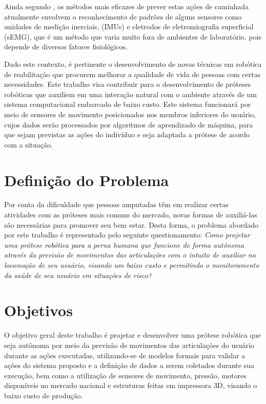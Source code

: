 Ainda segundo , os métodos mais eficazes de prever estas ações de caminhada atualmente envolvem o reconhecimento de padrões de alguns sensores como unidades de medição inerciais, (IMUs) e eletrodos de eletromiografia superficial (sEMG), que é um método que varia muito fora de ambientes de laboratório, pois depende de diversos fatores fisiológicos.

Dado este contexto, é pertinente o desenvolvimento de novas técnicas em robótica de reabilitação que procurem melhorar a qualidade de vida de pessoas com certas necessidades. Este trabalho visa contribuir para o desenvolvimento de próteses robóticas que auxiliem em uma interação natural com o ambiente através de um sistema computacional embarcado de baixo custo. Este sistema funcionará por meio de sensores de movimento posicionados nos membros inferiores do usuário, cujos dados serão processados por algoritmos de aprendizado de máquina, para que sejam previstas as ações do indivíduo e seja adaptada a prótese de acordo com a situação.

\section{Definição do Problema}
Por conta da dificuldade que pessoas amputadas têm em realizar certas atividades com as próteses mais comuns do mercado, novas formas de auxiliá-las são necessárias para promover seu bem estar. Desta forma, o problema abordado por este trabalho é representado pelo seguinte questionamento: \textit{Como projetar uma prótese robótica para a perna humana que funcione de forma autônoma através da previsão de movimentos das articulações com o intuito de auxiliar na locomoção de seu usuário, visando um baixo custo e permitindo o monitoramento da saúde de seu usuário em situações de risco?}	

\section{Objetivos}
\label{sec:objetivos}
O objetivo geral deste trabalho é projetar e desenvolver uma prótese robótica que seja autônoma por meio da previsão de movimentos das articulações do usuário durante as ações executadas, utilizando-se de modelos formais para validar a ações do sistema proposto e a definição de dados a serem coletados durante sua execução, bem como a utilização de sensores de movimento, pressão, motores disponíveis no mercado nacional e estruturas feitas em impressora 3D, visando o baixo custo de produção.

